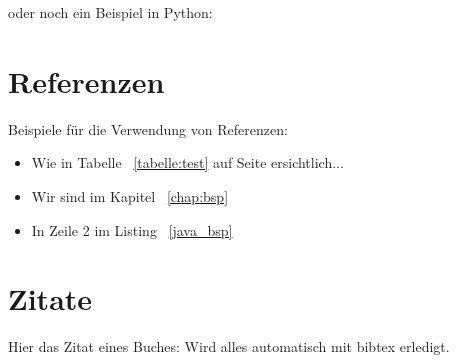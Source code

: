oder noch ein Beispiel in Python:


\section{Referenzen}

Beispiele für die Verwendung von Referenzen: 

\begin{itemize}
	\item Wie in Tabelle ~\ref{tabelle:test} auf Seite \pageref{tabelle:test} ersichtlich... 
	\item Wir sind im Kapitel ~\ref{chap:bsp}
	\item In Zeile 2 im Listing ~\ref{java_bsp} 
\end{itemize}


\section{Zitate}


Hier das Zitat eines Buches: \cite{couper2001} Wird alles automatisch mit  bibtex erledigt.